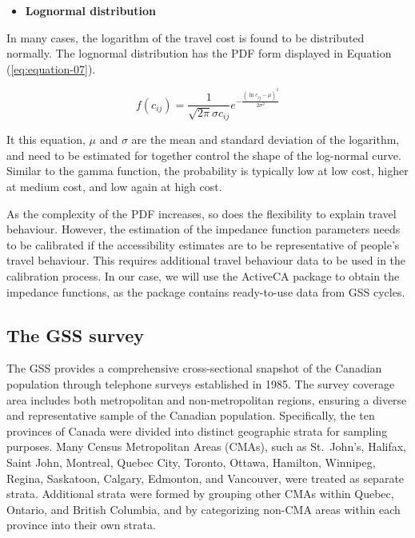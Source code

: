 \documentclass[preprint, 3p,
authoryear]{elsarticle} %
\providecommand{\tightlist}{%
  \setlength{\itemsep}{0pt}\setlength{\parskip}{0pt}}
\begin{document}
\begin{itemize}
\tightlist
\item
  \textbf{Lognormal distribution}
\end{itemize}

In many cases, the logarithm of the travel cost is found to be
distributed normally. The lognormal distribution has the PDF form
displayed in Equation (\ref{eq:equation-07}).

\begin{equation}
f(c_{ij}) = \frac{1}{\sqrt{2\pi} \sigma c_{ij}} e^{-\frac{(\ln c_{ij} - \mu)^2}{2\sigma^2}}
\label{eq:equation-07}
\end{equation}

It this equation, \(\mu\) and \(\sigma\) are the mean and standard
deviation of the logarithm, and need to be estimated for together
control the shape of the log-normal curve. Similar to the gamma
function, the probability is typically low at low cost, higher at medium
cost, and low again at high cost.

As the complexity of the PDF increases, so does the flexibility to
explain travel behaviour. However, the estimation of the impedance
function parameters needs to be calibrated if the accessibility
estimates are to be representative of people's travel behaviour. This
requires additional travel behaviour data to be used in the calibration
process. In our case, we will use the ActiveCA package to obtain the
impedance functions, as the package contains ready-to-use data from GSS
cycles.

\hypertarget{the-gss-survey}{%
\subsection{The GSS survey}\label{the-gss-survey}}

The GSS provides a comprehensive cross-sectional snapshot of the
Canadian population through telephone surveys established in 1985. The
survey coverage area includes both metropolitan and non-metropolitan
regions, ensuring a diverse and representative sample of the Canadian
population. Specifically, the ten provinces of Canada were divided into
distinct geographic strata for sampling purposes. Many Census
Metropolitan Areas (CMAs), such as St.~John's, Halifax, Saint John,
Montreal, Quebec City, Toronto, Ottawa, Hamilton, Winnipeg, Regina,
Saskatoon, Calgary, Edmonton, and Vancouver, were treated as separate
strata. Additional strata were formed by grouping other CMAs within
Quebec, Ontario, and British Columbia, and by categorizing non-CMA areas
within each province into their own strata.
\end{document}
